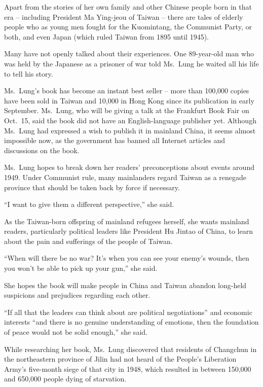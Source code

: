 ﻿\documentclass[12pt]{article}
\begin{document}
Apart from the stories of her own family and other Chinese people born in that era -- including
President Ma Ying-jeou of Taiwan -- there are tales of elderly people who as young men fought for
the Kuomintang, the Communist Party, or both, and even Japan (which ruled Taiwan from 1895 until
1945).

Many have not openly talked about their experiences. One 89-year-old man who was held by the
Japanese as a prisoner of war told Ms.~Lung he waited all his life to tell his story.

Ms.~Lung's book has become an instant best seller -- more than 100,000 copies have been sold in
Taiwan and 10,000 in Hong Kong since its publication in early September. Ms.~Lung, who will be
giving a talk at the Frankfurt Book Fair on Oct.~15, said the book did not have an English-language
publisher yet. Although Ms.~Lung had expressed a wish to publish it in mainland China, it seems
almost impossible now, as the government has banned all Internet articles and discussions on the
book.

Ms.~Lung hopes to break down her readers' preconceptions about events around 1949. Under Communist
rule, many mainlanders regard Taiwan as a renegade province that should be taken back by force if
necessary.

``I want to give them a different perspective,'' she said.

As the Taiwan-born offspring of mainland refugees herself, she wants mainland readers, particularly
political leaders like President Hu Jintao of China, to learn about the pain and sufferings of the
people of Taiwan.

``When will there be no war? It's when you can see your enemy's wounds, then you won't be able to
pick up your gun,'' she said.

She hopes the book will make people in China and Taiwan abandon long-held suspicions and prejudices
regarding each other.

``If all that the leaders can think about are political negotiations'' and economic interests ``and
there is no genuine understanding of emotions, then the foundation of peace would not be solid
enough,'' she said.

While researching her book, Ms.~Lung discovered that residents of Changchun in the northeastern
province of Jilin had not heard of the People's Liberation Army's five-month siege of that city in
1948, which resulted in between 150,000 and 650,000 people dying of starvation.
\end{document}
